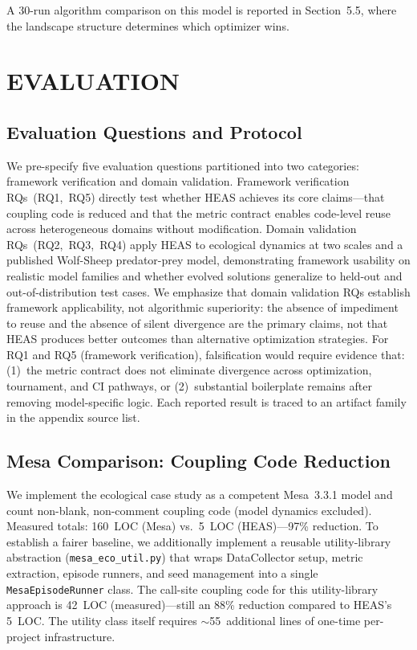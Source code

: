 \documentclass{wscpaperproc}
\begin{document}
A 30-run algorithm comparison on this model is reported in Section~5.5,
where the landscape structure determines which optimizer wins.

\section{EVALUATION}

\subsection{Evaluation Questions and Protocol}

We pre-specify five evaluation questions partitioned into two categories:
framework verification and domain validation. Framework verification
RQs~(RQ1,~RQ5) directly test whether HEAS achieves its core claims---that
coupling code is reduced and that the metric contract enables code-level reuse
across heterogeneous domains without modification. Domain validation
RQs~(RQ2,~RQ3,~RQ4) apply HEAS to ecological dynamics at two scales and a
published Wolf-Sheep predator-prey model, demonstrating framework usability on
realistic model families and whether evolved solutions generalize to held-out
and out-of-distribution test cases. We emphasize that domain validation RQs
establish framework applicability, not algorithmic superiority: the absence of
impediment to reuse and the absence of silent divergence are the primary
claims, not that HEAS produces better outcomes than alternative optimization
strategies. For RQ1 and RQ5 (framework verification), falsification would
require evidence that: (1)~the metric contract does not eliminate divergence
across optimization, tournament, and CI pathways, or (2)~substantial boilerplate
remains after removing model-specific logic. Each reported result is traced to
an artifact family in the appendix source list.

\subsection{Mesa Comparison: Coupling Code Reduction}
\label{sec:mesa-comparison}

We implement the ecological case study as a competent Mesa~3.3.1 model and
count non-blank, non-comment coupling code (model dynamics excluded).
Measured totals: 160~LOC (Mesa) vs.\ 5~LOC (HEAS)---97\% reduction.
To establish a fairer baseline, we additionally implement a reusable
utility-library abstraction (\texttt{mesa\_eco\_util.py}) that wraps
DataCollector setup, metric extraction, episode runners, and seed management
into a single \texttt{MesaEpisodeRunner} class. The call-site coupling code
for this utility-library approach is 42~LOC (measured)---still an 88\%
reduction compared to HEAS's 5~LOC. The utility class itself requires
$\sim$55~additional lines of one-time per-project infrastructure.
\end{document}
